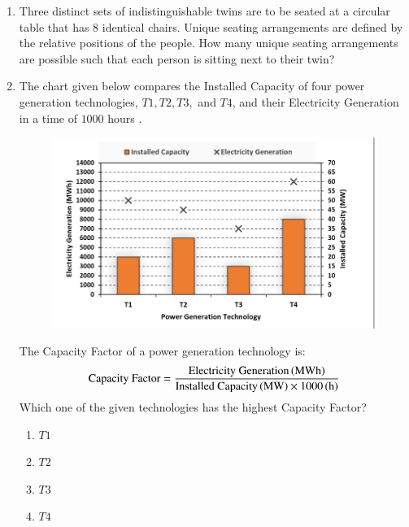 \documentclass[journal,12pt,onecolumn]{IEEEtran}
\theoremstyle{remark}
\begin{document}
\begin{enumerate}
		\item Three distinct sets of indistinguishable twins are to be seated at a circular table that has $8$ identical chairs. Unique seating arrangements are defined by the relative positions of the people. How many unique seating arrangements are possible such that each person is sitting next to their twin?
		
		\hfill{}
		\begin{enumerate}
		\end{enumerate}
		
		\item The chart given below compares the Installed Capacity  of four power generation technologies, $T1, T2, T3,$ and $T4$, and their Electricity Generation  in a time of $1000$ hours \brak{\text{h}}.
		\begin{figure}
			\includegraphics[width = 0.8\columnwidth]{q8}
			\caption*{}
			\label{fig:q8}
		\end{figure}
		The Capacity Factor of a power generation technology is:
		$$ \text{Capacity Factor} = \frac{\text{Electricity Generation}\left(\text{MWh}\right)}{\text{Installed Capacity}\left(\text{MW}\right)\times1000\left(\text{h}\right)} $$
		Which one of the given technologies has the highest Capacity Factor?
		
		\hfill{\brak{\text{GATE GA 2024}}}
		\begin{enumerate}
			\item $T1$
			\item $T2$
			\item $T3$
			\item $T4$
		\end{enumerate}
		

\end{enumerate}
\end{document}
